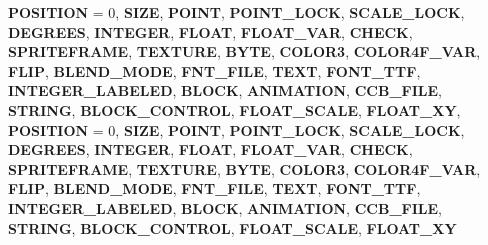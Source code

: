 \begin{DoxyCompactItemize}
{\bfseries P\+O\+S\+I\+T\+I\+ON} = 0, 
{\bfseries S\+I\+ZE}, 
{\bfseries P\+O\+I\+NT}, 
{\bfseries P\+O\+I\+N\+T\+\_\+\+L\+O\+CK}, 
\newline
{\bfseries S\+C\+A\+L\+E\+\_\+\+L\+O\+CK}, 
{\bfseries D\+E\+G\+R\+E\+ES}, 
{\bfseries I\+N\+T\+E\+G\+ER}, 
{\bfseries F\+L\+O\+AT}, 
\newline
{\bfseries F\+L\+O\+A\+T\+\_\+\+V\+AR}, 
{\bfseries C\+H\+E\+CK}, 
{\bfseries S\+P\+R\+I\+T\+E\+F\+R\+A\+ME}, 
{\bfseries T\+E\+X\+T\+U\+RE}, 
\newline
{\bfseries B\+Y\+TE}, 
{\bfseries C\+O\+L\+O\+R3}, 
{\bfseries C\+O\+L\+O\+R4\+F\+\_\+\+V\+AR}, 
{\bfseries F\+L\+IP}, 
\newline
{\bfseries B\+L\+E\+N\+D\+\_\+\+M\+O\+DE}, 
{\bfseries F\+N\+T\+\_\+\+F\+I\+LE}, 
{\bfseries T\+E\+XT}, 
{\bfseries F\+O\+N\+T\+\_\+\+T\+TF}, 
\newline
{\bfseries I\+N\+T\+E\+G\+E\+R\+\_\+\+L\+A\+B\+E\+L\+ED}, 
{\bfseries B\+L\+O\+CK}, 
{\bfseries A\+N\+I\+M\+A\+T\+I\+ON}, 
{\bfseries C\+C\+B\+\_\+\+F\+I\+LE}, 
\newline
{\bfseries S\+T\+R\+I\+NG}, 
{\bfseries B\+L\+O\+C\+K\+\_\+\+C\+O\+N\+T\+R\+OL}, 
{\bfseries F\+L\+O\+A\+T\+\_\+\+S\+C\+A\+LE}, 
{\bfseries F\+L\+O\+A\+T\+\_\+\+XY}, 
\newline
{\bfseries P\+O\+S\+I\+T\+I\+ON} = 0, 
{\bfseries S\+I\+ZE}, 
{\bfseries P\+O\+I\+NT}, 
{\bfseries P\+O\+I\+N\+T\+\_\+\+L\+O\+CK}, 
\newline
{\bfseries S\+C\+A\+L\+E\+\_\+\+L\+O\+CK}, 
{\bfseries D\+E\+G\+R\+E\+ES}, 
{\bfseries I\+N\+T\+E\+G\+ER}, 
{\bfseries F\+L\+O\+AT}, 
\newline
{\bfseries F\+L\+O\+A\+T\+\_\+\+V\+AR}, 
{\bfseries C\+H\+E\+CK}, 
{\bfseries S\+P\+R\+I\+T\+E\+F\+R\+A\+ME}, 
{\bfseries T\+E\+X\+T\+U\+RE}, 
\newline
{\bfseries B\+Y\+TE}, 
{\bfseries C\+O\+L\+O\+R3}, 
{\bfseries C\+O\+L\+O\+R4\+F\+\_\+\+V\+AR}, 
{\bfseries F\+L\+IP}, 
\newline
{\bfseries B\+L\+E\+N\+D\+\_\+\+M\+O\+DE}, 
{\bfseries F\+N\+T\+\_\+\+F\+I\+LE}, 
{\bfseries T\+E\+XT}, 
{\bfseries F\+O\+N\+T\+\_\+\+T\+TF}, 
\newline
{\bfseries I\+N\+T\+E\+G\+E\+R\+\_\+\+L\+A\+B\+E\+L\+ED}, 
{\bfseries B\+L\+O\+CK}, 
{\bfseries A\+N\+I\+M\+A\+T\+I\+ON}, 
{\bfseries C\+C\+B\+\_\+\+F\+I\+LE}, 
\newline
{\bfseries S\+T\+R\+I\+NG}, 
{\bfseries B\+L\+O\+C\+K\+\_\+\+C\+O\+N\+T\+R\+OL}, 
{\bfseries F\+L\+O\+A\+T\+\_\+\+S\+C\+A\+LE}, 
{\bfseries F\+L\+O\+A\+T\+\_\+\+XY}

\end{DoxyCompactItemize}
